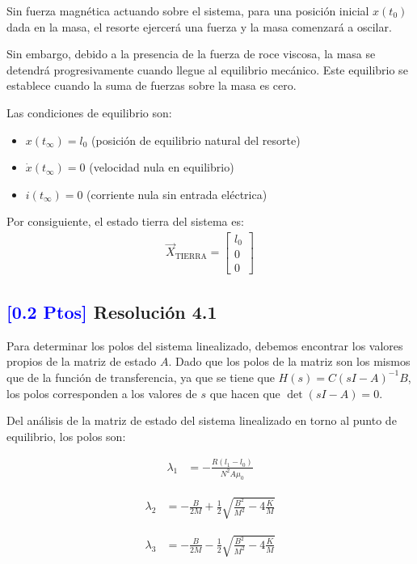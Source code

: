 \documentclass[
  11pt,
  letterpaper,
   addpoints,
   answers
  ]{exam}
\begin{document}
\begin{solution}
Sin fuerza magnética actuando sobre el sistema, para una posición inicial $x(t_0)$ dada en la masa, el resorte ejercerá una fuerza y la masa comenzará a oscilar. 

Sin embargo, debido a la presencia de la fuerza de roce viscosa, la masa se detendrá progresivamente cuando llegue al equilibrio mecánico. Este equilibrio se establece cuando la suma de fuerzas sobre la masa es cero.

Las condiciones de equilibrio son:
\begin{itemize}
    \item $x(t_{\infty}) = l_0$ (posición de equilibrio natural del resorte)
    \item $\dot{x}(t_{\infty}) = 0$ (velocidad nula en equilibrio)
    \item $i(t_{\infty}) = 0$ (corriente nula sin entrada eléctrica)
\end{itemize}

Por consiguiente, el estado tierra del sistema es:
\begin{align}
\vec{X}_{\text{TIERRA}} = \begin{bmatrix}
l_0 \\
0 \\
0
\end{bmatrix}
\end{align}

\subsection*{\textcolor{blue}{[0.2 Ptos]} Resolución 4.1}

Para determinar los polos del sistema linealizado, debemos encontrar los valores propios de la matriz de estado $A$. Dado que los polos de la matriz son los mismos que de la función de transferencia, ya que se tiene que $H(s) = C(sI-A)^{-1}B$, los polos corresponden a los valores de $s$ que hacen que $\det(sI-A) = 0$.

Del análisis de la matriz de estado del sistema linealizado en torno al punto de equilibrio, los polos son:

\begin{align}
\lambda_1 &= -\frac{R(l_1-l_0)}{N^2A\mu_0}
\end{align}

\begin{align}
\lambda_2 &= -\frac{B}{2M} + \frac{1}{2}\sqrt{\frac{B^2}{M^2} - 4\frac{K}{M}}
\end{align}

\begin{align}
\lambda_3 &= -\frac{B}{2M} - \frac{1}{2}\sqrt{\frac{B^2}{M^2} - 4\frac{K}{M}}
\end{align}


\end{solution}
\end{document}
